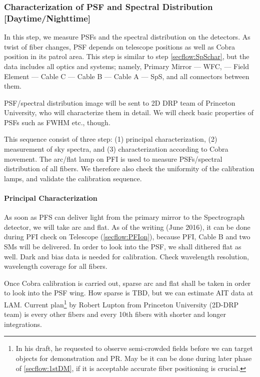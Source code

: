 \subsubsection{Characterization of PSF and Spectral Distribution [Daytime/Nighttime]}\label{secflow:PSFchar}


In this step, we measure PSFs and the spectral distribution on the detectors.
As twist of fiber changes, PSF depends on telescope positions as well as Cobra position in its patrol area.
This step is similar to step \ref{secflow:SpSchar}, but the data includes all optics and systems; namely, Primary Mirror --- WFC, --- Field Element --- Cable C --- Cable B --- Cable A --- SpS, and all connectors between them.

PSF/spectral distribution image will be sent to 2D DRP team of Princeton University, who will characterize them in detail.
We will check basic properties of PSFs such as FWHM etc., though.

This sequence consist of three step: (1) principal characterization, (2) measurement of sky spectra, and (3) characterization according to Cobra movement.
The arc/flat lamp on PFI is used to measure PSFs/spectral distribution of all fibers.
We therefore also check the uniformity of the calibration lamps, and validate the calibration sequence.

\paragraph{Principal Characterization}
As soon as PFS can deliver light from the primary mirror to the Spectrograph detector, we will take arc and flat.
As of the writing (June 2016), it can be done during PFI check on Telescope (\ref{secflow:PFIon}), because PFI, Cable B and two SMs will be delivered.
In order to look into the PSF, we shall dithered flat as well.
Dark and bias data is needed for calibration.
Check wavelength resolution, wavelength coverage for all fibers.

Once Cobra calibration is carried out, sparse arc and flat shall be taken in order to look into the PSF wing.
How sparse is TBD, but we can estimate AIT data at LAM.
Current plan\footnote{In his draft, he requested to observe semi-crowded fields before we can target objects for demonstration and PR. May be it can be done during later phase of \ref{secflow:1stDM}, if it is acceptable accurate fiber positioning is crucial.} by Robert Lupton from Princeton University (2D-DRP team) is every other fibers and every 10th fibers with shorter and longer integrations.

